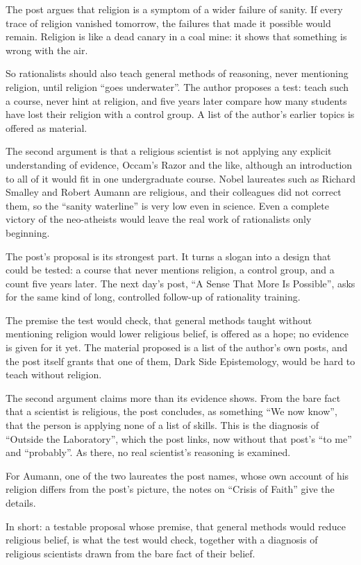 \begin{afterword}
\summaryhead

The post argues that religion is a symptom of a wider failure of sanity. If every trace of religion vanished tomorrow, the failures that made it possible would remain. Religion is like a dead canary in a coal mine: it shows that something is wrong with the air.

So rationalists should also teach general methods of reasoning, never mentioning religion, until religion ``goes underwater''. The author proposes a test: teach such a course, never hint at religion, and five years later compare how many students have lost their religion with a control group. A list of the author's earlier topics is offered as material.

The second argument is that a religious scientist is not applying any explicit understanding of evidence, Occam's Razor and the like, although an introduction to all of it would fit in one undergraduate course. Nobel laureates such as Richard Smalley and Robert Aumann are religious, and their colleagues did not correct them, so the ``sanity waterline'' is very low even in science. Even a complete victory of the neo-atheists would leave the real work of rationalists only beginning.

\responsehead

The post's proposal is its strongest part. It turns a slogan into a design that could be tested: a course that never mentions religion, a control group, and a count five years later. The next day's post, ``A Sense That More Is Possible'', asks for the same kind of long, controlled follow-up of rationality training.

The premise the test would check, that general methods taught without mentioning religion would lower religious belief, is offered as a hope; no evidence is given for it yet. The material proposed is a list of the author's own posts, and the post itself grants that one of them, Dark Side Epistemology, would be hard to teach without religion.

The second argument claims more than its evidence shows. From the bare fact that a scientist is religious, the post concludes, as something ``We now know'', that the person is applying none of a list of skills. This is the diagnosis of ``Outside the Laboratory'', which the post links, now without that post's ``to me'' and ``probably''. As there, no real scientist's reasoning is examined.

For Aumann, one of the two laureates the post names, whose own account of his religion differs from the post's picture, the notes on ``Crisis of Faith'' give the details.

In short: a testable proposal whose premise, that general methods would reduce religious belief, is what the test would check, together with a diagnosis of religious scientists drawn from the bare fact of their belief.
\end{afterword}
